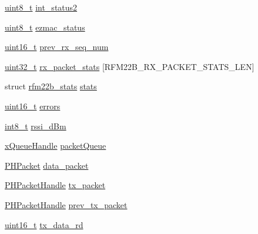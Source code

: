 \begin{DoxyCompactItemize}
\item 
\hyperlink{stdint_8h_aba7bc1797add20fe3efdf37ced1182c5}{uint8\-\_\-t} \hyperlink{structpios__rfm22b__dev_a59c62fb8b9b007e94890dc8a9d9c72e3}{int\-\_\-status2}
\item 
\hyperlink{stdint_8h_aba7bc1797add20fe3efdf37ced1182c5}{uint8\-\_\-t} \hyperlink{structpios__rfm22b__dev_ae89edb5d4197faaeab67b5f0b010f5f8}{ezmac\-\_\-status}
\item 
\hyperlink{stdint_8h_a273cf69d639a59973b6019625df33e30}{uint16\-\_\-t} \hyperlink{structpios__rfm22b__dev_a932f3bf8b3d7c94a5404fad6ff6801d4}{prev\-\_\-rx\-\_\-seq\-\_\-num}
\item 
\hyperlink{stdint_8h_a435d1572bf3f880d55459d9805097f62}{uint32\-\_\-t} \hyperlink{structpios__rfm22b__dev_acae5126a75716a87ed65f6d354df1d6a}{rx\-\_\-packet\-\_\-stats} \mbox{[}R\-F\-M22\-B\-\_\-\-R\-X\-\_\-\-P\-A\-C\-K\-E\-T\-\_\-\-S\-T\-A\-T\-S\-\_\-\-L\-E\-N\mbox{]}
\item 
struct \hyperlink{structrfm22b__stats}{rfm22b\-\_\-stats} \hyperlink{structpios__rfm22b__dev_abb8511852ba38b8de9c19aaae6a495f0}{stats}
\item 
\hyperlink{stdint_8h_a273cf69d639a59973b6019625df33e30}{uint16\-\_\-t} \hyperlink{structpios__rfm22b__dev_a538dcdf62ddc3430e172d88eb252dc0d}{errors}
\item 
\hyperlink{stdint_8h_ad566f6541e98b74246db1a3a3a85ad49}{int8\-\_\-t} \hyperlink{structpios__rfm22b__dev_a7efa2c785a1c9feaff4db472c1f22805}{rssi\-\_\-d\-Bm}
\item 
\hyperlink{_common_2_libraries_2_free_r_t_o_s_2_source_2include_2queue_8h_a229037f755b756156e34a440ce134b8b}{x\-Queue\-Handle} \hyperlink{structpios__rfm22b__dev_ab04a8d36db91686aaf0748e5db71ca0f}{packet\-Queue}
\item 
\hyperlink{struct_p_h_packet}{P\-H\-Packet} \hyperlink{structpios__rfm22b__dev_a19e3336c0f0c2da02404e828d688cbd3}{data\-\_\-packet}
\item 
\hyperlink{group___open_pilot_libraries_gaa252eac3dc3346fec375be8805fd8694}{P\-H\-Packet\-Handle} \hyperlink{structpios__rfm22b__dev_a3b7420bb896bb0b1504c4795c8af9087}{tx\-\_\-packet}
\item 
\hyperlink{group___open_pilot_libraries_gaa252eac3dc3346fec375be8805fd8694}{P\-H\-Packet\-Handle} \hyperlink{structpios__rfm22b__dev_a4c0368362858e8e4450ce094670e9b3d}{prev\-\_\-tx\-\_\-packet}
\item 
\hyperlink{stdint_8h_a273cf69d639a59973b6019625df33e30}{uint16\-\_\-t} \hyperlink{structpios__rfm22b__dev_a19f0507e484216186dab475d3d5f15a0}{tx\-\_\-data\-\_\-rd}

\end{DoxyCompactItemize}
